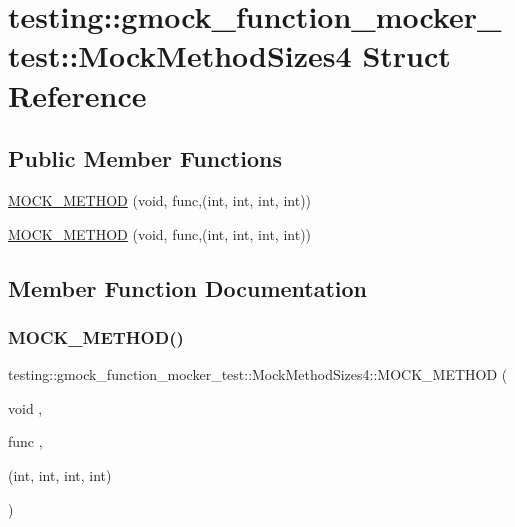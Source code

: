 \hypertarget{structtesting_1_1gmock__function__mocker__test_1_1_mock_method_sizes4}{}\section{testing\+::gmock\+\_\+function\+\_\+mocker\+\_\+test\+::Mock\+Method\+Sizes4 Struct Reference}
\label{structtesting_1_1gmock__function__mocker__test_1_1_mock_method_sizes4}
\subsection*{Public Member Functions}
\begin{DoxyCompactItemize}
\item 
\mbox{\hyperlink{structtesting_1_1gmock__function__mocker__test_1_1_mock_method_sizes4_a026e4cb12aefad0481229b30044cc93e}{M\+O\+C\+K\+\_\+\+M\+E\+T\+H\+OD}} (void, func,(int, int, int, int))
\item 
\mbox{\hyperlink{structtesting_1_1gmock__function__mocker__test_1_1_mock_method_sizes4_a026e4cb12aefad0481229b30044cc93e}{M\+O\+C\+K\+\_\+\+M\+E\+T\+H\+OD}} (void, func,(int, int, int, int))
\end{DoxyCompactItemize}


\subsection{Member Function Documentation}
\mbox{\label{structtesting_1_1gmock__function__mocker__test_1_1_mock_method_sizes4_a026e4cb12aefad0481229b30044cc93e}} 
\subsubsection{\texorpdfstring{MOCK\_METHOD()}{MOCK\_METHOD()}\hspace{0.1cm}{\footnotesize\ttfamily [1/2]}}
{\footnotesize\ttfamily testing\+::gmock\+\_\+function\+\_\+mocker\+\_\+test\+::\+Mock\+Method\+Sizes4\+::\+M\+O\+C\+K\+\_\+\+M\+E\+T\+H\+OD (\begin{DoxyParamCaption}\item[{void}]{,  }\item[{func}]{,  }\item[{(int, int, int, int)}]{ }\end{DoxyParamCaption})}

